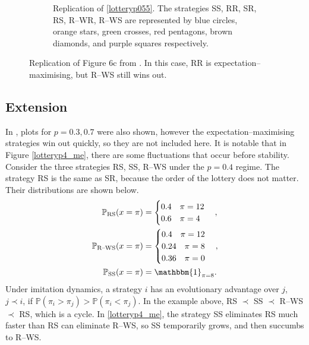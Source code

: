 \begin{figure}[!h]
\begin{subfigure}[b]{0.45\textwidth}
    \caption{Replication of \ref{lotteryp055}. The strategies SS, RR, SR, RS, R--WR, R--WS are represented by blue circles, orange stars, green crosses, red pentagons, brown diamonds, and purple squares respectively. }
    \label{lotteryp4_me_2}
  \end{subfigure}
  \caption{Replication of Figure 6c from \cite{RN30}. In this case, RR is expectation--maximising, but R--WS still wins out.} \label{lottery_comp5}
\end{figure} 
\FloatBarrier

\subsection{Extension}
In \cite{RN30}, plots for $p=0.3, 0.7$ were also shown, however the expectation--maximising strategies win out quickly, so they are not included here. It is notable that in Figure \ref{lotteryp4_me}, there are some fluctuations that occur before stability. Consider the three strategies RS, SS, R--WS under the $p=0.4$ regime. The strategy RS is the same as SR, because the order of the lottery does not matter. Their distributions are shown below. \\
\begin{align*}
    \mathbb P_{\text{RS}}(x = \pi)  &= \begin{cases} 0.4 \quad \pi = 12 \\
    0.6 \quad \pi =4 
    \end{cases}, \\
        \mathbb P_{\text{R--WS}}(x = \pi)  &= \begin{cases} 0.4 \quad \pi = 12 \\
    0.24 \quad \pi =8 \\
    0.36 \quad \pi = 0\\
    \end{cases}, \\
    \mathbb P_{\text{SS}}(x = \pi)  &= \mathbbm{1}_{\pi = 8}.
\end{align*}
Under imitation dynamics, a strategy $i$ has an evolutionary advantage over $j$, $j \prec i$, if $\mathbb P(\pi_i > \pi_j) > \mathbb P(\pi_i < \pi_j)$. In the example above, RS $\prec$ SS $\prec$ R--WS $\prec$ RS, which is a cycle. In \ref{lotteryp4_me}, the strategy SS eliminates RS much faster than RS can eliminate R--WS, so SS temporarily grows, and then succumbs to R--WS. \\

